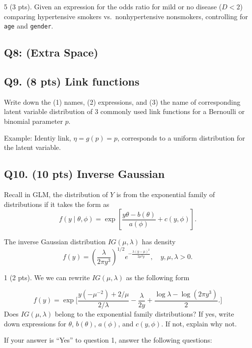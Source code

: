\documentclass[
]{article}
\begin{document}
5 (3 pts). Given an expression for the odds ratio for mild or no disease
(\(D < 2\)) comparing hypertensive smokers vs.~nonhypertensive
nonsmokers, controlling for \texttt{age} and \texttt{gender}.

\newpage

\subsection{Q8: (Extra Space)}\label{q8-extra-space}

\newpage

\subsection{Q9. (8 pts) Link functions}\label{q9.-8-pts-link-functions}

Write down the (1) names, (2) expressions, and (3) the name of
corresponding latent variable distribution of 3 commonly used link
functions for a Bernoulli or binomial parameter \(p\).

Example: Identiy link, \(\eta = g(p) = p\), corresponds to a uniform
distribution for the latent variable.

\newpage

\subsection{Q10. (10 pts) Inverse
Gaussian}\label{q10.-10-pts-inverse-gaussian}

Recall in GLM, the distribution of \(Y\) is from the exponential family
of distributions if it takes the form as \[
  f(y \mid \theta, \phi) = \exp \left[ \frac{y \theta - b(\theta)}{a(\phi)} + c(y, \phi) \right].
\]

The inverse Gaussian distribution \(IG(\mu, \lambda)\) has density \[
f(y) = \left( \frac{\lambda}{2 \pi y^3} \right)^{1/2} e^{- \frac{\lambda (y - \mu)^2}{2 \mu^2 y}}, \quad y, \mu, \lambda > 0.
\]

1 (2 pts). We we can rewrite \(IG(\mu, \lambda)\) as the following form

\[
f(y) = \exp \bigg[ \frac{y (-\mu^{-2}) + 2/\mu}{2/\lambda} - \frac{\lambda}{2y} + \frac{\log \lambda - \log (2\pi y^3)}{2}. \bigg]
\] \quad  Does \(IG(\mu, \lambda)\) belong to the exponential family
distributions? If yes, write down expressions for \(\theta\),
\(b(\theta)\), \(a(\phi)\), and \(c(y, \phi)\). If not, explain why not.

If your answer is ``Yes'' to question 1, answer the following questions:
\end{document}
